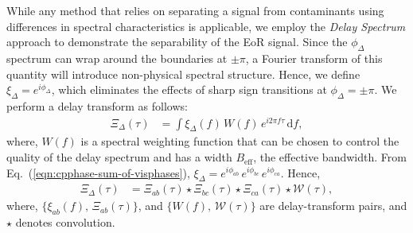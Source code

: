 \documentclass[
reprint,
superscriptaddress,
amsmath,
amssymb,
aps,
prd
]{revtex4-1}
\begin{document}
While any method that relies on separating a signal from contaminants using differences in spectral characteristics is applicable, we employ the {\it Delay Spectrum} approach \cite{par12a,par12b} to demonstrate the separability of the EoR signal. Since the $\phi_\Delta$ spectrum can wrap around the boundaries at $\pm\pi$, a Fourier transform of this quantity will introduce non-physical spectral structure. Hence, we define $\xi_\Delta = e^{i\phi_\Delta}$, which eliminates the effects of sharp sign transitions at $\phi_\Delta=\pm\pi$. We perform a delay transform as follows:
\begin{align}\label{eqn:cpdspec}
  \Xi_\Delta(\tau) &= \int \xi_\Delta(f)\,W(f)\,e^{i2\pi f\tau}\,\mathrm{d}f,
\end{align}
where, $W(f)$ is a spectral weighting function that can be chosen to control the quality of the delay spectrum \citep{thy13,thy16} and has a width $B_\textrm{eff}$, the effective bandwidth. From Eq.~(\ref{eqn:cpphase-sum-of-visphases}), $\xi_\Delta = e^{i\phi_{ab}}\,e^{i\phi_{bc}}\,e^{i\phi_{ca}}$. Hence,
\begin{align}
  \Xi_\Delta(\tau) &= \Xi_{ab}(\tau) \star \Xi_{bc}(\tau) \star \Xi_{ca}(\tau) \star \mathcal{W}(\tau), \label{eqn:cpdspec-convolution}
\end{align}
where, $\{\xi_{ab}(f),\,\Xi_{ab}(\tau)\}$, and $\{W(f),\,\mathcal{W}(\tau)\}$ are delay-transform pairs, and $\star$ denotes convolution. 

\end{document}
